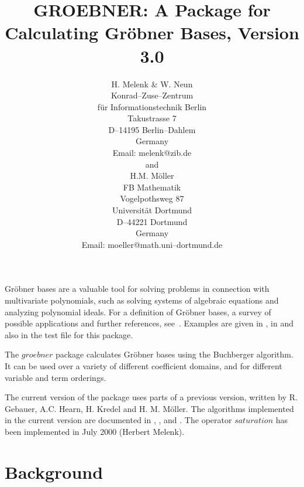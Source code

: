 \title{GROEBNER: A Package for Calculating Gr\"obner Bases, Version 3.0}
\date{}
\author{
H. Melenk \& W. Neun \\[0.05in]
Konrad--Zuse--Zentrum \\
f\"ur Informationstechnik Berlin \\
Takustrasse 7 \\
D--14195 Berlin--Dahlem \\
Germany \\[0.05in]
Email:  melenk@zib.de \\[0.05in]
and \\[0.05in]
H.M. M\"oller \\[0.05in]
FB Mathematik \\
Vogelpothsweg 87\\
Universit\"at Dortmund \\
D--44221 Dortmund \\
Germany\\[0.05in]
Email: moeller@math.uni--dortmund.de}


\maketitle

Gr\"obner bases are a valuable tool for solving problems in
connection with multivariate polynomials, such as solving systems of
algebraic equations and analyzing polynomial ideals. For a definition
of Gr\"obner bases, a survey of possible applications and further
references, see~\cite{Buchberger:85}. Examples are given in \cite{Boege:86},
in \cite{Buchberger:88} and also in the test file for this package.

 
The $groebner$ package calculates Gr\"obner bases using the
Buchberger algorithm.  It can be used over a variety of different
coefficient domains, and for different variable and term orderings.

The current version of the package uses parts of a previous
version, written by  R. Gebauer, A.C. Hearn, H. Kredel and H. M.
M\"oller. The algorithms implemented in the current version are
documented in \cite{Faugere:89}, \cite{Gebauer:88},
\cite{Kredel:88a} and \cite{Giovini:91}.
The operator $saturation$ has been implemented in July 2000 (Herbert Melenk).
\section{Background}

